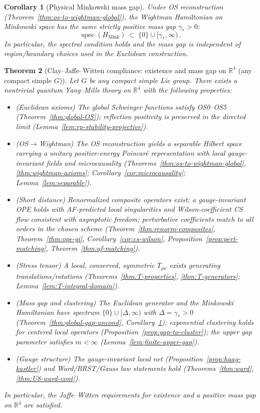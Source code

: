 \documentclass[11pt]{amsart}
\theoremstyle{plain}
\newtheorem{theorem}{Theorem}[section]
\newtheorem{corollary}[theorem]{Corollary}
\theoremstyle{definition}
\theoremstyle{remark}
\begin{document}
\begin{corollary}[Physical Minkowski mass gap]\label{cor:minkowski-massgap}
Under OS reconstruction (Theorem~\ref{thm:os-to-wightman-global}), the Wightman Hamiltonian on Minkowski space has the same strictly positive mass gap $\gamma_*>0$:
\[
  \operatorname{spec}(H_{\mathrm{Mink}})\ \subset\ \{0\}\cup[\gamma_*,\infty)\,.
\]
In particular, the spectral condition holds and the mass gap is independent of region/boundary choices used in the Euclidean construction.
\end{corollary}

\begin{theorem}[Clay–Jaffe–Witten compliance: existence and mass gap on $\mathbb R^4$ (any compact simple $G$)]\label{thm:clay-compliance}
Let $G$ be any compact simple Lie group. There exists a nontrivial quantum Yang–Mills theory on $\mathbb R^4$ with the following properties:
\begin{itemize}
  \item (Euclidean axioms) The global Schwinger functions satisfy OS0--OS5 (Theorem~\ref{thm:global-OS}); reflection positivity is preserved in the directed limit (Lemma~\ref{lem:rp-stability-projective}).
  \item (OS$\to$Wightman) The OS reconstruction yields a separable Hilbert space carrying a unitary positive-energy Poincar\'e representation with local gauge-invariant fields and microcausality (Theorems~\ref{thm:os-to-wightman-global}, \ref{thm:wightman-axioms}; Corollary~\ref{cor:microcausality}; Lemma~\ref{lem:separable}).
  \item (Short distance) Renormalized composite operators exist; a gauge-invariant OPE holds with AF-predicted local singularities and Wilson-coefficient CS flow consistent with asymptotic freedom; perturbative coefficients match to all orders in the chosen scheme (Theorem~\ref{thm:renorm-composites}, Theorem~\ref{thm:ope-gi}, Corollary~\ref{cor:cs-wilson}, Proposition~\ref{prop:pert-matching}, Theorem~\ref{thm:af-matching}).
  \item (Stress tensor) A local, conserved, symmetric $T_{\mu\nu}$ exists generating translations/rotations (Theorems~\ref{thm:T-properties}, \ref{thm:T-generators}; Lemma~\ref{lem:T-integral-domain}).
  \item (Mass gap and clustering) The Euclidean generator and the Minkowski Hamiltonian have spectrum $\{0\}\cup[\Delta,\infty)$ with $\Delta=\gamma_*>0$ (Theorem~\ref{thm:global-gap-uncond}, Corollary~\ref{cor:minkowski-massgap}); exponential clustering holds for centered local operators (Proposition~\ref{prop:gap-to-cluster}); the upper gap parameter satisfies $m<\infty$ (Lemma~\ref{lem:finite-upper-gap}).
  \item (Gauge structure) The gauge-invariant local net (Proposition~\ref{prop:haag-kastler}) and Ward/BRST/Gauss law statements hold (Theorems~\ref{thm:ward}, \ref{thm:U8-ward-cont}).
\end{itemize}
In particular, the Jaffe–Witten requirements for existence and a positive mass gap on $\mathbb R^4$ are satisfied.
\end{theorem}
\end{document}

